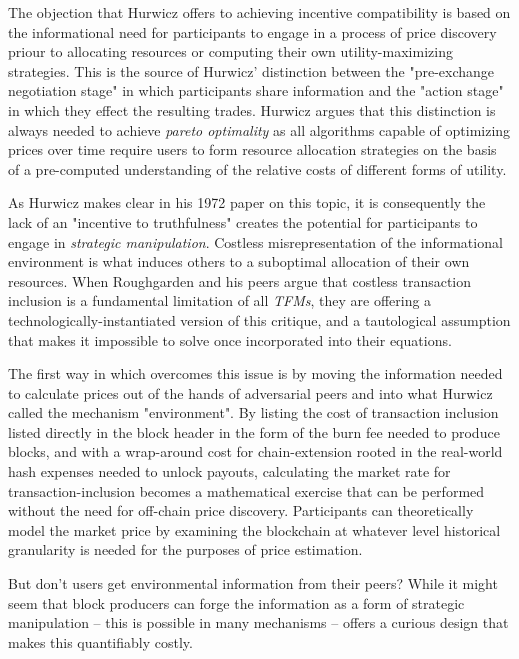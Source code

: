 The objection that Hurwicz offers to achieving incentive compatibility is based on the informational need for participants to engage in a process of price discovery priour to allocating resources or computing their own utility-maximizing strategies. This is the source of Hurwicz' distinction between the "pre-exchange negotiation stage" in which participants share information and the "action stage" in which they effect the resulting trades. Hurwicz argues that this distinction is always needed to achieve \textit{pareto optimality} as all algorithms capable of optimizing prices over time require users to form resource allocation strategies on the basis of a pre-computed understanding of the relative costs of different forms of utility.

As Hurwicz makes clear in his 1972 paper on this topic, it is consequently the lack of an "incentive to truthfulness" creates the potential for participants to engage in \textit{strategic manipulation}. Costless misrepresentation of the informational environment is what induces others to a suboptimal allocation of their own resources. When Roughgarden and his peers argue that costless transaction inclusion is a fundamental limitation of all \textit{TFMs}, they are offering a technologically-instantiated version of this critique, and a tautological assumption that makes it impossible to solve once incorporated into their equations.

The first way in which \ourTFM overcomes this issue is by moving the information needed to calculate prices out of the hands of adversarial peers and into what Hurwicz called the mechanism "environment". By listing the cost of transaction inclusion listed directly in the block header in the form of the burn fee needed to produce blocks, and with a wrap-around cost for chain-extension rooted in the real-world hash expenses needed to unlock payouts, calculating the market rate for transaction-inclusion becomes a mathematical exercise that can be performed without the need for off-chain price discovery. Participants can theoretically model the market price by examining the blockchain at whatever level historical granularity is needed for the purposes of price estimation.

But don't users get environmental information from their peers? While it might seem that block producers can forge the information as a form of strategic manipulation -- this is possible in many mechanisms -- \ourTFM offers a curious design that makes this quantifiably costly.

